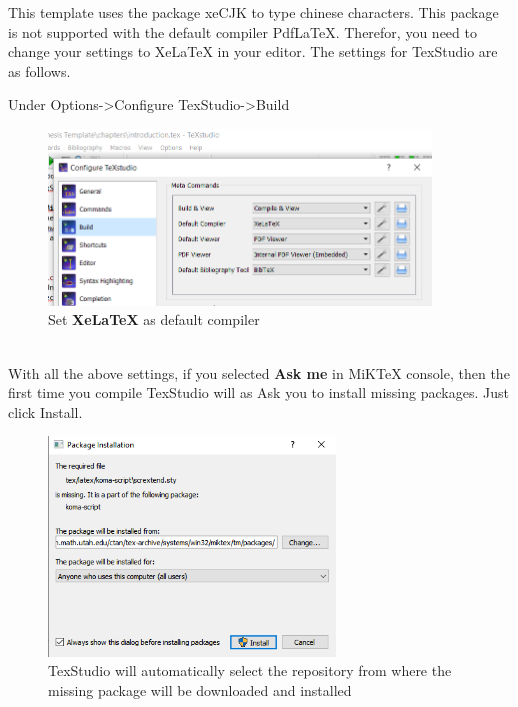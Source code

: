 This template uses the package xeCJK to type chinese characters. This package is not supported with the default compiler PdfLaTeX. Therefor, you need to change your settings to XeLaTeX in your editor. The settings for TexStudio are as follows.

Under  Options->Configure TexStudio->Build\\
\begin{figure}[!h]                      
	\centering                             
	\includegraphics[width = 4in]{figures/TexStudioConfig.png}
	\caption{Set \textbf{XeLaTeX} as default compiler}
	\label{figConquistador}                         
\end{figure}\\
With all the above settings, if you selected \textbf{Ask me} in MiKTeX console, then the first time you compile TexStudio will as Ask you to install missing packages. Just click  Install. 
\begin{figure}[b]                      
	\centering                             
	\includegraphics[width = 3in]{figures/InstallMissinPackages.png}
	\caption{TexStudio will automatically select the repository from where the missing package will be downloaded and installed}
	\label{figConquistador}                         
\end{figure} 




